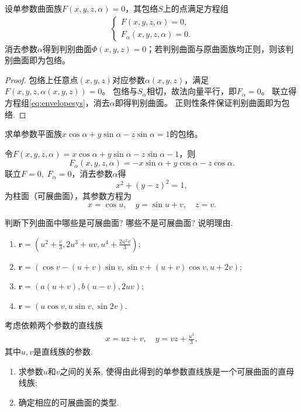 \documentclass[../../main.tex]{subfiles}%
\begin{document}
\begin{proposition}
设单参数曲面族$F(x,y,z,\alpha)=0$，其包络$S$上的点满足方程组
\begin{align}
\begin{cases}
F(x,y,z,\alpha)=0,\\
F_\alpha(x,y,z,\alpha)=0.
\end{cases}
\label{eq:envelopesys}
\end{align}
消去参数$\alpha$得到判别曲面$\Phi(x,y,z)=0$；若判别曲面与原曲面族均正则，则该判别曲面即为包络。
\end{proposition}
\begin{proof}

包络上任意点$(x,y,z)$对应参数$\alpha(x,y,z)$，满足$F(x,y,z,\alpha(x,y,z))=0$。
包络与$S_\alpha$相切，故法向量平行，即$F_\alpha=0$。
联立得方程组\eqref{eq:envelopesys}，消去$\alpha$即得判别曲面。
正则性条件保证判别曲面即为包络.

\end{proof}

\begin{example}
求单参数平面族$x\cos\alpha+y\sin\alpha-z\sin\alpha=1$的包络。
\end{example}
\begin{solution}

令$F(x,y,z,\alpha)=x\cos\alpha+y\sin\alpha-z\sin\alpha-1$，则
$$F_\alpha(x,y,z,\alpha)=-x\sin\alpha+y\cos\alpha-z\cos\alpha.$$
联立$F=0,\;F_\alpha=0$，消去参数$\alpha$得
$$x^2+(y-z)^2=1,$$
为柱面（可展曲面），其参数方程为
$$x=\cos u,\quad y=\sin u+v,\quad z=v.$$

\end{solution}

\begin{example}
判断下列曲面中哪些是可展曲面? 哪些不是可展曲面? 说明理由.
\begin{enumerate}[(1)]
\item $\bm{r}=\left(u^2+\frac{v}{3},2u^3+uv,u^4+\frac{2u^2v}{3}\right)$;
\item $\bm{r}=(\cos v-(u+v)\sin v,\sin v+(u+v)\cos v,u+2v)$;
\item $\bm{r}=(a(u+v),b(u-v),2uv)$;
\item $\bm{r}=(u\cos v,u\sin v,\sin 2v)$.
\end{enumerate}
\end{example}

\begin{example}
考虑依赖两个参数的直线族
\begin{align*}
x=uz+v,\quad y=vz+\frac{u^3}{3},
\end{align*}
其中$u,v$是直线族的参数.
\begin{enumerate}[(1)]
\item 求参数$u$和$v$之间的关系, 使得由此得到的单参数直线族是一个可展曲面的直母线族;
\item 确定相应的可展曲面的类型.
\end{enumerate}
\end{example}
\end{document}
